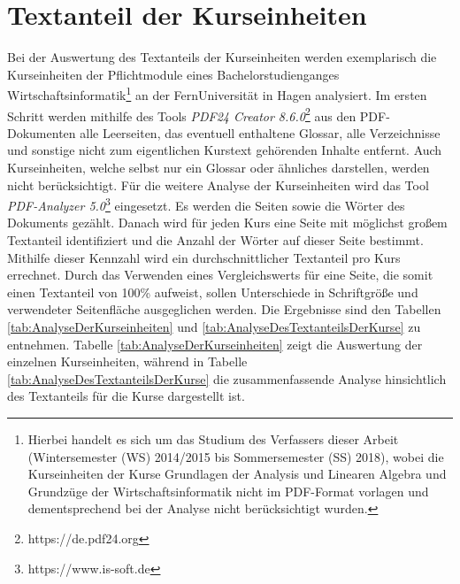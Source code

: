 \section{Textanteil der Kurseinheiten}
\label{sec:TextanteilDerKurseinheiten}
Bei der Auswertung des Textanteils der Kurseinheiten werden exemplarisch die Kurseinheiten der Pflichtmodule eines Bachelorstudienganges Wirtschaftsinformatik\footnote{Hierbei handelt es sich um das Studium des Verfassers dieser Arbeit (Wintersemester (WS) 2014/2015 bis Sommersemester (SS) 2018), wobei die Kurseinheiten der Kurse \glqq Grundlagen der Analysis und Linearen Algebra\grqq{} und \glqq Grundzüge der Wirtschaftsinformatik\grqq{} nicht im PDF-Format vorlagen und dementsprechend bei der Analyse nicht berücksichtigt wurden.} an der FernUniversität in Hagen analysiert. Im ersten Schritt werden mithilfe des Tools \textit{PDF24 Creator 8.6.0}\footnote{https://de.pdf24.org} aus den PDF-Dokumenten alle Leerseiten, das eventuell enthaltene Glossar, alle Verzeichnisse und sonstige nicht zum eigentlichen Kurstext gehörenden Inhalte entfernt. Auch Kurseinheiten, welche selbst nur ein Glossar oder ähnliches darstellen, werden nicht berücksichtigt. Für die weitere Analyse der Kurseinheiten wird das Tool \textit{PDF-Analyzer 5.0}\footnote{https://www.is-soft.de} eingesetzt. Es werden die Seiten sowie die Wörter des Dokuments gezählt. Danach wird für jeden Kurs eine Seite mit möglichst großem Textanteil identifiziert und die Anzahl der Wörter auf dieser Seite bestimmt. Mithilfe dieser Kennzahl wird ein durchschnittlicher Textanteil pro Kurs errechnet. Durch das Verwenden eines Vergleichswerts für eine Seite, die somit einen Textanteil von 100\% aufweist, sollen Unterschiede in Schriftgröße und verwendeter Seitenfläche ausgeglichen werden.
Die Ergebnisse sind den Tabellen \ref{tab:AnalyseDerKurseinheiten} und \ref{tab:AnalyseDesTextanteilsDerKurse} zu entnehmen. Tabelle \ref{tab:AnalyseDerKurseinheiten} zeigt die Auswertung der einzelnen Kurseinheiten, während in Tabelle \ref{tab:AnalyseDesTextanteilsDerKurse} die zusammenfassende Analyse hinsichtlich des Textanteils für die Kurse dargestellt ist.

